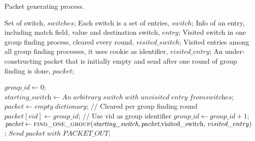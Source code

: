 \begin {tcolorbox}[blanker,float=tbp,
grow to left by=1cm, grow to right by=1cm]
\begin{algorithm}[H]

  \caption{Packet generating process.}
  \begin{algorithmic}[1]
    \Require
      Set of switch, $switches$;  \newline
      Each switch is a set of entries, $switch$;  \newline
      Info of an entry, including match field, value and destination switch, $entry$;  \newline
      Visited switch in one group finding process, cleared every round, $visited\_switch$;  \newline
      Visited entries among all group finding processes, it uses cookie as identifier, $visited\_entry$; \newline
      An under-constructing packet that is initially empty and send after one round of group finding is done, $packet$; \newline

      
      \State $\textit{group\_id} \gets 0$;
            \State $\textit{starting\_switch} \gets An\;arbitrary\;switch\;with\;unvisited\;entry\;from\textit{switches}$;
            \State $\textit{packet} \gets empty\;dictionary$;   // Cleared per group finding round
            \State $packet[vid] \gets \textit{group\_id}$;   // Use vid as group identifier 
            \State $group\_id \gets \textit{group\_id} + 1$;
            \State $\textit{packet} \gets \Call{find\_one\_group}{\textit{starting\_switch}, \textit{packet}, $visited\_switch, $visited\_entry}$;
            \State $Send\;\textit{packet}\;with\;PACKET\_OUT$;
      \EndWhile
    \EndFunction
    \State
  \end{algorithmic}
\end{algorithm}
\end{tcolorbox}

